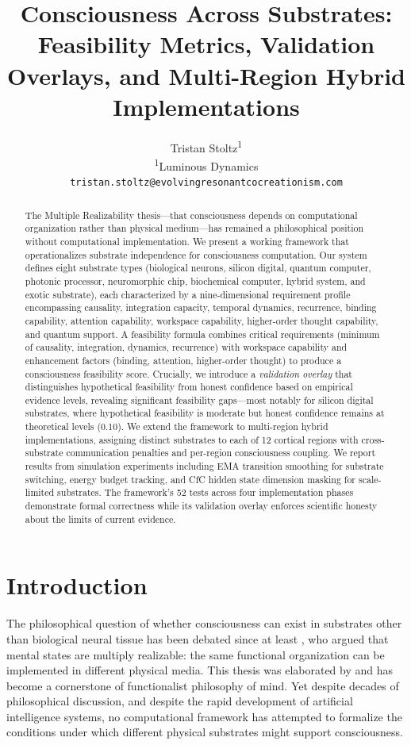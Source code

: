 \documentclass[12pt,a4paper]{article}
\title{Consciousness Across Substrates:\\Feasibility Metrics, Validation Overlays, and Multi-Region Hybrid Implementations}
\author{
  Tristan Stoltz\textsuperscript{1} \\
  \textsuperscript{1}Luminous Dynamics \\
  \texttt{tristan.stoltz@evolvingresonantcocreationism.com}
}
\date{}
\begin{document}
\maketitle

\begin{abstract}
The Multiple Realizability thesis---that consciousness depends on computational organization rather than physical medium---has remained a philosophical position without computational implementation. We present a working framework that operationalizes substrate independence for consciousness computation. Our system defines eight substrate types (biological neurons, silicon digital, quantum computer, photonic processor, neuromorphic chip, biochemical computer, hybrid system, and exotic substrate), each characterized by a nine-dimensional requirement profile encompassing causality, integration capacity, temporal dynamics, recurrence, binding capability, attention capability, workspace capability, higher-order thought capability, and quantum support. A feasibility formula combines critical requirements (minimum of causality, integration, dynamics, recurrence) with workspace capability and enhancement factors (binding, attention, higher-order thought) to produce a consciousness feasibility score. Crucially, we introduce a \emph{validation overlay} that distinguishes hypothetical feasibility from honest confidence based on empirical evidence levels, revealing significant feasibility gaps---most notably for silicon digital substrates, where hypothetical feasibility is moderate but honest confidence remains at theoretical levels (0.10). We extend the framework to multi-region hybrid implementations, assigning distinct substrates to each of 12 cortical regions with cross-substrate communication penalties and per-region consciousness coupling. We report results from simulation experiments including EMA transition smoothing for substrate switching, energy budget tracking, and CfC hidden state dimension masking for scale-limited substrates. The framework's 52 tests across four implementation phases demonstrate formal correctness while its validation overlay enforces scientific honesty about the limits of current evidence.
\end{abstract}

\section{Introduction}

The philosophical question of whether consciousness can exist in substrates other than biological neural tissue has been debated since at least \citet{putnam1967psychological}, who argued that mental states are multiply realizable: the same functional organization can be implemented in different physical media. This thesis was elaborated by \citet{fodor1974special} and has become a cornerstone of functionalist philosophy of mind. Yet despite decades of philosophical discussion, and despite the rapid development of artificial intelligence systems, no computational framework has attempted to formalize the conditions under which different physical substrates might support consciousness.
\end{document}
